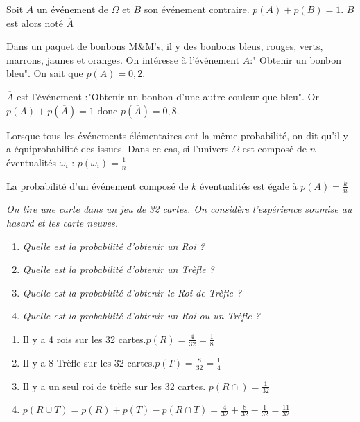 \begin{Pp}
Soit $A$ un événement de $\Omega$ et $B$ son événement contraire. $p (A)+ p (B)=1$. $B$ est alors noté $\overline{A}$
\end{Pp}

\begin{Ex}
Dans un paquet de bonbons M\&M's, il y des bonbons bleus, rouges, verts, marrons, jaunes et oranges. On intéresse à l'événement $A$:" Obtenir un bonbon bleu". On sait que $p(A)=0,2$.

$\overline{A}$ est l'événement :"Obtenir un bonbon d'une autre couleur que bleu". Or $p(A)+p\left(\overline{A}\right)=1$ donc $p\left(\overline{A}\right)=0,8$.
\end{Ex}



\begin{Pp}[Équiprobabilité]
Lorsque tous les événements élémentaires ont la même probabilité, on dit qu'il y a équiprobabilité des
issues.
Dans ce cas, si l'univers $\Omega$ est composé de $n$ éventualités $\omega_i$ : $p(\omega_i)=\frac{1}{n}$

La probabilité d'un événement composé de $k$ éventualités est égale à $p(A)=\frac{k}{n}$
\end{Pp}


\begin{Ex}
\textit{On tire une carte dans un jeu de 32 cartes. On considère l'expérience soumise au hasard et les carte neuves.}
\begin{enumerate}
\item \textit{Quelle est la probabilité d'obtenir un Roi ?}
\item \textit{Quelle est la probabilité d'obtenir un Trèfle ?}
\item \textit{Quelle est la probabilité d'obtenir le Roi de Trèfle ?}
\item \textit{Quelle est la probabilité d'obtenir un Roi ou un Trèfle ?}
\end{enumerate}

\begin{enumerate}
\item Il y a 4 rois sur les 32 cartes.$p(R)=\frac{4}{32}=\frac{1}{8}$
\item Il y a 8 Trèfle sur les 32 cartes.$p(T)=\frac{8}{32}=\frac{1}{4}$
\item Il y a un seul roi de trèfle sur les 32 cartes. $p(R \cap)=\frac{1}{32}$
\item $p(R \cup T)=p(R)+p(T)-p(R \cap T) = \frac{4}{32} + \frac{8}{32} - \frac{1}{32} =\frac{11}{32}$
\end{enumerate}
\end{Ex}


